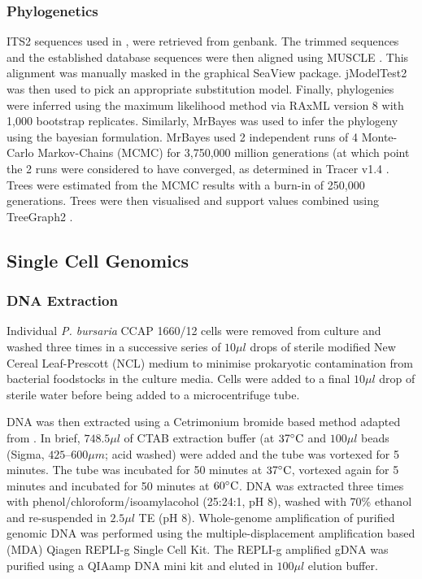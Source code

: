 \subsubsection{Phylogenetics}

ITS2 sequences used in \citep{Hoshina2010}, \citep{Hoshina2013} were retrieved
from genbank. 
The trimmed sequences and the established database sequences were then
aligned using MUSCLE \citep{Edgar2004}. This alignment was manually masked in the graphical 
SeaView \citep{Gouy2010} package.
jModelTest2 \citep{Guindon2003,Darriba2012} was then used to pick an appropriate substitution model.
Finally, phylogenies were inferred using the maximum likelihood
method via RAxML version 8 \citep{Stamatakis2014} with 1,000 bootstrap replicates.
Similarly, MrBayes \citep{Huelsenbeck2001} was used to infer the phylogeny using the bayesian
formulation.  MrBayes used 2 independent runs of 4 Monte-Carlo Markov-Chains (MCMC) for
3,750,000 million generations (at which point the 2 runs were considered to have converged, 
as determined in Tracer v1.4 \citep{rambaut2007tracer}.  Trees were estimated
from the MCMC results with a burn-in of 250,000 generations.
Trees were then visualised and support values combined using TreeGraph2 \citep{Stover2010}.

\subsection{Single Cell Genomics}

\subsubsection{DNA Extraction}

Individual \textit{P. bursaria} CCAP 1660/12 cells were removed from culture 
and washed three times in a successive series of 
\(10 \mu l\) drops of sterile modified 
New Cereal Leaf-Prescott (NCL) medium to minimise prokaryotic contamination from 
bacterial foodstocks in the culture media. 
Cells were added to a final \(10\mu l\) drop of sterile water before being added
to a microcentrifuge tube.

DNA was then extracted using a Cetrimonium bromide based method adapted from \citep{Winnepenninckx1993}. 
In brief,  \(748.5 \mu l\) of CTAB extraction buffer (at \(37\celsius\) and \(100 \mu l\) beads (Sigma, \(425 – 600 \mu m\); acid washed) 
were added and the tube was vortexed for 5 minutes. 
The tube was incubated for 50 minutes at \(37\celsius\), 
vortexed again for 5 minutes and incubated for 50 minutes at \(60\celsius\). 
DNA was extracted three times with phenol/chloroform/isoamylacohol (25:24:1, pH 8), washed with 70\% ethanol and 
re-suspended in \(2.5 \mu l\) TE (pH 8). 
Whole-genome amplification of purified genomic DNA was performed using the multiple-displacement amplification based
(MDA) Qiagen REPLI-g Single Cell Kit. 
The REPLI-g amplified gDNA was purified using a QIAamp DNA mini kit and eluted in \(100 \mu l\) elution buffer.

